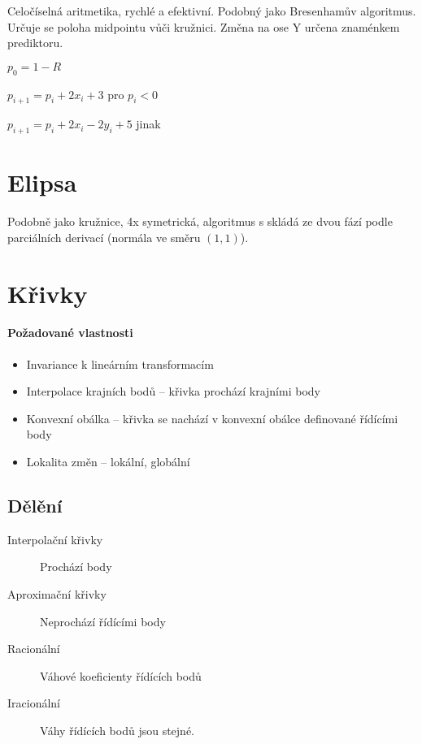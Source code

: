 \documentclass[a4paper, 11pt]{report}
\begin{document}
Celočíselná aritmetika, rychlé a  efektivní. Podobný jako Bresenhamův algoritmus. Určuje se poloha midpointu vůči kružnici. Změna na ose Y určena znaménkem prediktoru.

$p_0 = 1-R$

$p_{i+1} = p_i + 2 x_i + 3$ pro $p_i < 0$

$p_{i+1} = p_i + 2 x_i - 2y_i + 5$ jinak

\section{Elipsa}
Podobně jako kružnice, 4x symetrická, algoritmus s skládá ze dvou fází podle parciálních derivací (normála ve směru $(1,1)$).

\section{Křivky}

\paragraph{Požadované vlastnosti}
\begin{itemize}
	\item Invariance k lineárním transformacím
	\item Interpolace krajních bodů -- křivka prochází krajními body
	\item Konvexní obálka -- křivka se nachází v konvexní obálce definované řídícími body
	\item Lokalita změn -- lokální, globální
\end{itemize}

\subsection{Dělění}
\begin{description}
	\item[Interpolační křivky] Prochází body
	\item[Aproximační křivky] Neprochází řídícími body
\end{description}

\begin{description}
	\item[Racionální] Váhové koeficienty řídících bodů
	\item[Iracionální] Váhy řídících bodů jsou stejné.
\end{description}
\end{document}
